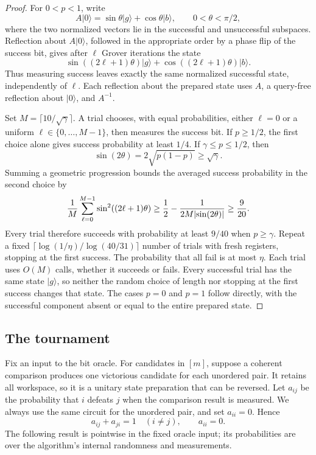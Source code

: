 \begin{proof}
For $0<p<1$, write
\[
 A\lvert0\rangle
   =\sin\theta\lvert g\rangle+\cos\theta\lvert b\rangle,
 \qquad 0<\theta<\pi/2,
\]
where the two normalized vectors lie in the successful and unsuccessful
subspaces. Reflection about $A\lvert0\rangle$, followed in the appropriate
order by a phase flip of the success bit, gives after $\ell$ Grover
iterations the state
\[
 \sin((2\ell+1)\theta)\lvert g\rangle
  +\cos((2\ell+1)\theta)\lvert b\rangle.
\]
Thus measuring success leaves exactly the same normalized successful
state, independently of $\ell$. Each reflection about the prepared state
uses $A$, a query-free reflection about $\lvert0\rangle$, and $A^{-1}$.

Set $M=\lceil10/\sqrt\gamma\rceil$. A trial chooses, with equal
probabilities, either $\ell=0$ or a uniform $\ell\in\{0,\ldots,M-1\}$,
then measures the success bit. If $p\ge1/2$, the first choice alone
gives success probability at least $1/4$. If $\gamma\le p\le1/2$,
then
\[
 \sin(2\theta)=2\sqrt{p(1-p)}\ge\sqrt\gamma.
\]
Summing a geometric progression bounds the averaged success probability
in the second choice by
\begin{equation}\label{eq:grover-average}
 \frac1M\sum_{\ell=0}^{M-1}\sin^2((2\ell+1)\theta)
 \ge \frac12-\frac{1}{2M\lvert\sin(2\theta)\rvert}
 \ge\frac{9}{20}.
\end{equation}
Every trial therefore succeeds with probability at least $9/40$ when
$p\ge\gamma$. Repeat a fixed
$\lceil\log(1/\eta)/\log(40/31)\rceil$ number of trials with fresh
registers, stopping at the first success. The probability that all fail
is at most $\eta$. Each trial uses $O(M)$ calls, whether it succeeds or
fails. Every successful trial has the same state $\lvert g\rangle$, so
neither the random choice of length nor stopping at the first success
changes that state. The cases $p=0$ and $p=1$ follow directly, with the
successful component absent or equal to the entire prepared state.
\end{proof}

\subsection{The tournament}

Fix an input to the bit oracle. For candidates in $[m]$, suppose a
coherent comparison produces one victorious candidate for each unordered
pair. It retains all workspace, so it is a unitary state preparation
that can be reversed. Let $a_{ij}$ be the probability that $i$ defeats
$j$ when the comparison result is measured. We always use the same
circuit for the unordered pair, and set $a_{ii}=0$. Hence
\begin{equation}\label{eq:complementarity}
 a_{ij}+a_{ji}=1\quad(i\ne j),\qquad a_{ii}=0.
\end{equation}
The following result is pointwise in the fixed
oracle input; its probabilities are over the algorithm's internal
randomness and measurements.

